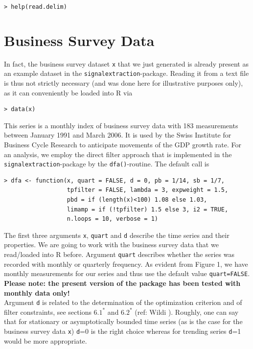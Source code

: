 \documentclass[a4paper]{article}
\begin{document}
\begin{verbatim}
> help(read.delim)
\end{verbatim}

\section{Business Survey Data}

In fact, the business survey dataset \texttt{x} that we just generated
is already present as an example dataset in the
\texttt{signalextraction}-package. Reading it from a text file is thus
not strictly necessary (and was done here for illustrative purposes
only), as it can conveniently be loaded into R via

\begin{verbatim}
> data(x)
\end{verbatim}

This series is a monthly index of business survey data with 183
measurements between January 1991 and March 2006. It is used by the
Swiss Institute for Business Cycle Research to anticipate movements of
the GDP growth rate. For an analysis, we employ the direct filter
approach that is implemented in the \texttt{signalextraction}-package
by the \texttt{dfa()}-routine. The default call is

\begin{verbatim}
> dfa <- function(x, quart = FALSE, d = 0, pb = 1/14, sb = 1/7,
                  tpfilter = FALSE, lambda = 3, expweight = 1.5, 
                  pbd = if (length(x)<100) 1.08 else 1.03, 
                  limamp = if (!tpfilter) 1.5 else 3, i2 = TRUE, 
                  n.loops = 10, verbose = 1)
\end{verbatim}

The first three arguments \texttt{x}, \texttt{quart} and \texttt{d}
describe the time series and their properties. We are going to work
with the business survey data that we read/loaded into R before. 
Argument \texttt{quart} describes whether the series was recorded with
monthly or quarterly frequency. As evident from Figure 1, we have
monthly measurements for our series and thus use the default value
\texttt{quart=FALSE}. \textbf{Please note: the present version of the
  package has been tested with monthly data only!} \\

Argument \texttt{d} is related to the determination of the
optimization criterion and of filter constraints, see sections $6.1^*$
and $6.2^*$ (ref: Wildi \cite{wildi2007}). Roughly, one can say that
for stationary or asymptotically bounded time series (as is the case
for the business survey data \texttt{x}) \texttt{d}=0 is the right
choice whereas for trending series \texttt{d}=1 would be more
appropriate. \\
\end{document}
